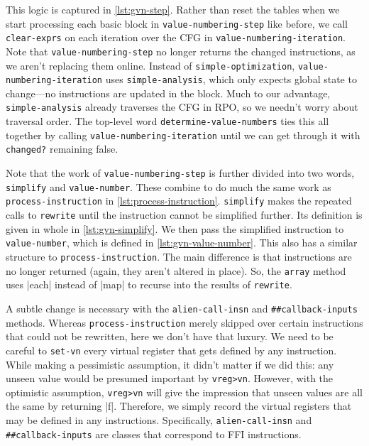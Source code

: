 This logic is captured in \vref{lst:gvn-step}.  Rather than reset the tables
when we start processing each basic block in \Verb|value-numbering-step| like
before, we call \Verb|clear-exprs| on each iteration over the \gls{CFG} in
\Verb|value-numbering-iteration|.  Note that \Verb|value-numbering-step| no
longer returns the changed instructions, as we aren't replacing them online.
Instead of \Verb|simple-optimization|, \Verb|value-numbering-iteration| uses
\Verb|simple-analysis|, which only expects global state to change---no
instructions are updated in the block.  Much to our advantage,
\Verb|simple-analysis| already traverses the \gls{CFG} in \acrlong{RPO}, so we
needn't worry about traversal order.  The top-level word
\Verb|determine-value-numbers| ties this all together by calling
\Verb|value-numbering-iteration| until we can get through it with
\Verb|changed?| remaining false.


\begin{sloppypar}
Note that the work of \Verb|value-numbering-step| is further divided into two
words, \Verb|simplify| and \Verb|value-number|.  These combine to do much the
same work as \Verb|process-instruction| in \vref{lst:process-instruction}.
\Verb|simplify| makes the repeated calls to \Verb|rewrite| until the
instruction cannot be simplified further.  Its definition is given in whole in
\vref{lst:gvn-simplify}.  We then pass the simplified instruction to
\Verb|value-number|, which is defined in \vref{lst:gvn-value-number}.  This
also has a similar structure to \Verb|process-instruction|.  The main
difference is that instructions are no longer returned (again, they aren't
altered in place).  So, the \Verb|array| method uses \factor|each| instead of
\factor|map| to recurse into the results of \Verb|rewrite|.
\end{sloppypar}


A subtle change is necessary with the \Verb|alien-call-insn| and
\Verb|##callback-inputs| methods.  Whereas \Verb|process-instruction| merely
skipped over certain instructions that could not be rewritten, here we don't
have that luxury.  We need to be careful to \Verb|set-vn| every virtual
register that gets defined by any instruction.  While making a pessimistic
assumption, it didn't matter if we did this: any unseen value would be presumed
important by \Verb|vreg>vn|.  However, with the optimistic assumption,
\Verb|vreg>vn| will give the impression that unseen values are all the same by
returning \factor|f|.  Therefore, we simply record the virtual registers that
may be defined in any instructions.  Specifically, \Verb|alien-call-insn| and
\Verb|##callback-inputs| are classes that correspond to \gls{FFI} instructions.

